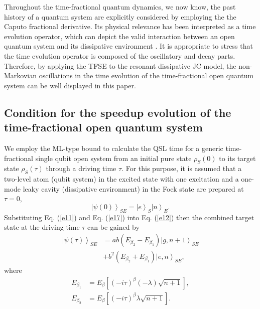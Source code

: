 \documentclass[
showpacs,  %
showkeys,  %
aps,       %
amsthm,    %
amsmath,   %
amsfonts,  %
amssymb    %
]{revtex4-1}          %
\begin{document}
Throughout the time-fractional quantum dynamics, we now know, the past history of a quantum system are explicitly considered by employing the the Caputo fractional derivative. Its physical relevance has been interpreted as a time evolution operator, which can depict the valid interaction between an open quantum system and its dissipative environment \cite{Iomin2009}. It is appropriate to stress that the time evolution operator is composed of the oscillatory and decay parts. Therefore, by applying the TFSE to the resonant dissipative JC model, the non-Markovian oscillations in the time evolution of the time-fractional open quantum system can be well displayed in this paper.



\subsection{Condition for the speedup evolution of the time-fractional open quantum system}
\label{Subsec:42}
We employ the ML-type bound to calculate the QSL time for a generic time-fractional single qubit open system from an initial pure state ${\rho _S}(0)$ to its target state ${\rho _S}(\tau )$ through a driving time $\tau$. For this purpose, it is assumed that a two-level atom (qubit system) in the excited state with one excitation and a one-mode leaky cavity (dissipative environment) in the Fock state are prepared at $\tau=0$,
\begin{equation}
\label{e17}
{\left| {\psi (0)} \right\rangle _{SE}} = {\left| e \right\rangle _S}{\left| n \right\rangle _E}.
\end{equation}
Substituting Eq. (\ref{e11}) and Eq. (\ref{e17}) into Eq. (\ref{e12}) then the combined target state at the driving time $\tau$ can be gained by
\begin{equation}
\label{e18}
\begin{aligned}
{\left| {\psi (\tau )} \right\rangle _{SE}} &= ab({E_{{\beta _2}}} - {E_{{\beta _1}}}){\left| {g,n + 1} \right\rangle _{SE}}\\
&+{b^2}({E_{{\beta _2}}} + {E_{{\beta _1}}}){\left| {e,n} \right\rangle _{SE}},
\end{aligned}
\end{equation}
where
\begin{equation}
\label{e19}
\begin{aligned}
{E_{{\beta _1}}} &= {E_\beta }\left[ {{{( - i\tau )}^\beta }( - \lambda )\sqrt {n + 1}} \right],\\
{E_{{\beta _2}}} &= {E_\beta }\left[ {{{( - i\tau )}^\beta }\lambda \sqrt {n + 1} } \right].
\end{aligned}
\end{equation}
\end{document}
